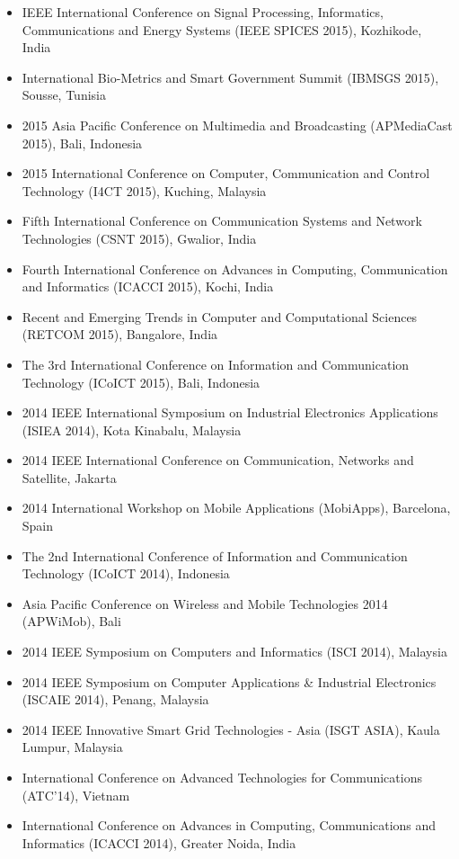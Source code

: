 \documentclass[11pt,a4paper,sans]{moderncv}   %
\begin{document}
\begin{itemize}
\item IEEE International Conference on Signal Processing, Informatics, Communications and Energy Systems (IEEE SPICES 2015), Kozhikode, India
\item International Bio-Metrics and Smart Government Summit (IBMSGS 2015), Sousse, Tunisia
\item 2015 Asia Pacific Conference on Multimedia and Broadcasting (APMediaCast 2015), Bali, Indonesia
\item 2015 International Conference on Computer, Communication and Control Technology (I4CT 2015), Kuching, Malaysia
\item Fifth International Conference on Communication Systems and Network Technologies (CSNT 2015), Gwalior, India
\item Fourth International Conference on Advances in Computing, Communication and Informatics (ICACCI 2015), Kochi, India
\item Recent and Emerging Trends in Computer and Computational Sciences (RETCOM 2015), Bangalore, India
\item The 3rd International Conference on Information and Communication Technology (ICoICT 2015), Bali, Indonesia
\item 2014 IEEE International Symposium on Industrial Electronics Applications (ISIEA 2014), Kota Kinabalu, Malaysia
\item 2014 IEEE International Conference on Communication, Networks and Satellite, Jakarta
\item 2014 International Workshop on Mobile Applications (MobiApps), Barcelona, Spain
\item The 2nd International Conference of Information and Communication Technology (ICoICT 2014), Indonesia
\item Asia Pacific Conference on Wireless and Mobile Technologies 2014 (APWiMob), Bali
\item 2014 IEEE Symposium on Computers and Informatics (ISCI 2014), Malaysia
\item 2014 IEEE Symposium on Computer Applications \& Industrial Electronics (ISCAIE 2014), Penang, Malaysia
\item 2014 IEEE Innovative Smart Grid Technologies - Asia (ISGT ASIA), Kaula Lumpur, Malaysia 
\item  International Conference on Advanced Technologies for Communications (ATC'14), Vietnam
\item International Conference on Advances in Computing, Communications and Informatics (ICACCI 2014), Greater Noida, India

\end{itemize}
\end{document}
